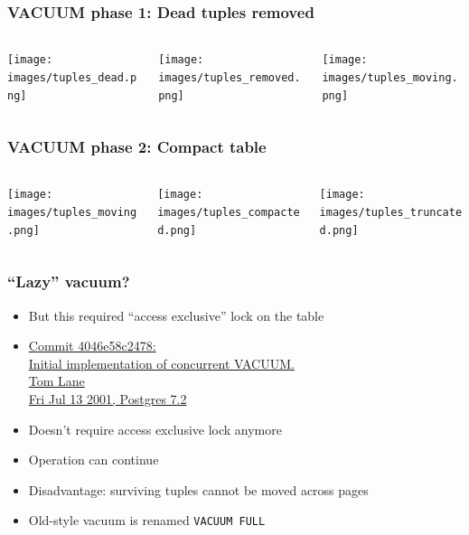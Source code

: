 \begin{frame}
  \frametitle{VACUUM phase 1: Dead tuples removed}
  \begin{columns}
    \begin{column}{0.33\textwidth}
      \texttt{[image: images/tuples\_dead.png]}
    \end{column}
    \begin{column}{0.33\textwidth}
      \texttt{[image: images/tuples\_removed.png]}
    \end{column}

    \begin{column}{0.33\textwidth}
      \texttt{[image: images/tuples\_moving.png]}
    \end{column}

  \end{columns}
\end{frame}

\begin{frame}
  \frametitle{VACUUM phase 2: Compact table}
  \begin{columns}
    \begin{column}{0.33\textwidth}
      \texttt{[image: images/tuples\_moving.png]}
    \end{column}
    \begin{column}{0.33\textwidth}
      \texttt{[image: images/tuples\_compacted.png]}
    \end{column}
    \begin{column}{0.33\textwidth}
      \texttt{[image: images/tuples\_truncated.png]}
    \end{column}
  \end{columns}
\end{frame}

\begin{frame}
  \frametitle{``Lazy'' vacuum?}
  \begin{itemize}
    \item But this required ``access exclusive'' lock on the table
    \item {\linksize \href{https://git.postgresql.org/cgit/postgresql.git/commit/?id=4046e58c2478cfcdd4334e2c282b5a42f047ea0b}
      {Commit 4046e58c2478: \faExternalLink \\
      Initial implementation of concurrent VACUUM. \\
      Tom Lane \\
      Fri Jul 13 2001, Postgres 7.2}}
    \item Doesn't require access exclusive lock anymore
    \item Operation can continue
    \item Disadvantage: surviving tuples cannot be moved across pages
    \item Old-style vacuum is renamed \texttt{VACUUM FULL}
  \end{itemize}
\end{frame}



